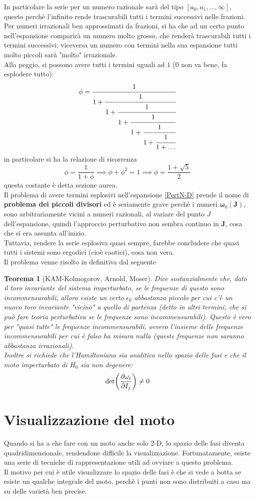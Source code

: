\documentclass[a4paper,12pt]{article}
\theoremstyle{plain}
\renewcommand{\vec}[1]{{\boldsymbol{#1}}}
\newtheorem{thm}{Teorema}[section]
\theoremstyle{definition}
\newcommand{\f}[2]{\frac{#1}{#2}}
\theoremstyle{remark}
\begin{document}
In particolare la serie per un numero razionale sarà del tipo $[a_0,a_1,\ldots,\infty]$, questo perchè l'infinito rende trascurabili tutti i termini successivi nelle frazioni.
\\Per numeri irrazionali ben approssimati da frazioni, si ha che ad un certo punto nell'espansione comparirà un numero molto grosso, che renderà trascurabili tutti i termini successivi; viceversa un numero con termini nella sua espansione tutti molto piccoli sarà "molto" irrazionale.\\ Alla peggio, si possono avere tutti i termini uguali ad $1$ ($0$ non va bene, fa esplodere tutto):
\[\phi=\cfrac{1}{1+\cfrac{1}{1+\cfrac{1}{1+\cfrac{1}{1+\cfrac{1}{1+\cfrac{1}{1+\ldots}}}}}}\]
in particolare si ha la relazione di ricorrenza
\[\phi=\frac{1}{1+\phi}\implies\phi+\phi^2=1\implies\phi=\f{1+\sqrt{5}}{2}\] 
questa costante è detta sezione aurea.\\
Il problema di avere termini esplosivi nell'espansione  \ref{PertN-D} prende il nome di \textbf{problema dei piccoli divisori} ed è seriamente grave perchè i numeri $\vec{\omega}_0(\vec{J})$, sono arbitrariamente vicini a numeri razionali, al variare del punto $J$ dell'espansione, quindi l'approccio perturbativo non sembra continuo in $\vec{J}$, cosa che si era assunta all'inizio.\\Tuttavia, rendere la serie esplosiva quasi sempre, farebbe concludere che quasi tutti i sistemi sono ergodici (cioè caotici), cosa non vera.\\ Il problema venne risolto in definitiva dal seguente\begin{thm}[KAM-Kolmogorov, Arnold, Moser]
	Dice sostanzialmente che, dato il toro invariante del sistema imperturbato, se le frequenze di questo sono incommensurabili, allora esiste un certo $\epsilon_0$ abbastanza piccolo per cui c'è un nuovo toro invariante "vicino" a quello di partenza (detto in altri termini, che si può fare teoria perturbativa se le frequenze sono incommensurabili). Questo è vero per "quasi tutte" le frequenze incommensurabili, ovvero l'insieme delle frequenze incommensurabili per cui è falso ha misura nulla (queste frequenze non saranno abbastanza irrazionali).\\Inoltre si richiede che l'Hamiltoniana sia analitica nello spazio delle fasi e che il moto imperturbato di $H_0$ sia non degenere:
	\[\det(\pdv{\omega_i}{I_j})\ne0\]
\end{thm}
\section{Visualizzazione del moto}
Quando si ha a che fare con un moto anche solo 2-D, lo spazio delle fasi diventa quadridimensionale, rendendone difficile la visualizzazione. Fortunatamente, esiste una serie di tecniche di rappresentazione utili ad ovviare a questo problema.\\Il motivo per cui è utile visualizzare lo spazio delle fasi è che si vede a botta se esiste un qualche integrale del moto, perchè i punti non sono distribuiti a caso ma su delle varietà ben precise.
\end{document}
